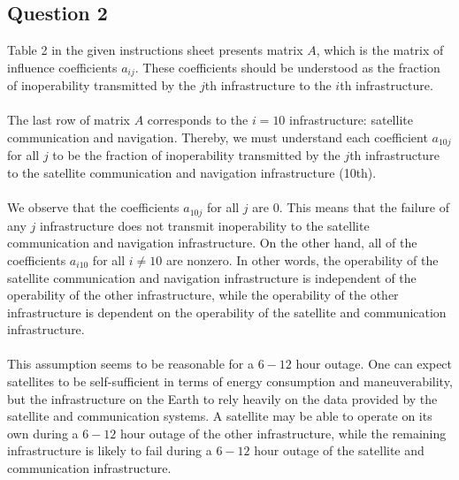 \documentclass[11pt,a4paper]{article}
\begin{document}
\subsection*{Question 2}
Table 2 in the given instructions sheet presents matrix $A$, which is the matrix of influence coefficients $a_{ij}$. These coefficients should be understood as the fraction of inoperability transmitted by the $j$th infrastructure to the $i$th infrastructure. \\
\\
The last row of matrix $A$ corresponds to the $i = 10$ infrastructure: satellite communication and navigation. Thereby, we must understand each coefficient $a_{10j}$ for all $j$ to be the fraction of inoperability transmitted by the $j$th infrastructure to the satellite communication and navigation infrastructure (10th).\\
\\
We observe that the coefficients $a_{10j}$ for all $j$ are $0$. This means that the failure of any $j$ infrastructure does not transmit inoperability to the satellite communication and navigation infrastructure. On the other hand, all of the coefficients $a_{i10}$ for all $i \neq 10$ are nonzero. In other words, the operability of the satellite communication and navigation infrastructure is independent of the operability of the other infrastructure, while the operability of the other infrastructure is dependent on the operability of the satellite and communication infrastructure. \\
\\
This assumption seems to be reasonable for a $6-12$ hour outage. One can expect satellites to be self-sufficient in terms of energy consumption and maneuverability, but the infrastructure on the Earth to rely heavily on the data provided by the satellite and communication systems. A satellite may be able to operate on its own during a $6-12$ hour outage of the other infrastructure, while the remaining infrastructure is likely to fail during a $6-12$ hour outage of the satellite and communication infrastructure.
\end{document}

